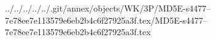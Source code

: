 ../../../../../.git/annex/objects/WK/3P/MD5E-s4477--7e78ee7e113579e6eb2b4c6f27925a3f.tex/MD5E-s4477--7e78ee7e113579e6eb2b4c6f27925a3f.tex